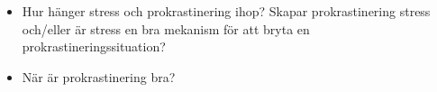 \begin{frame}
  \begin{question}
    \begin{itemize}
      \item Hur hänger stress och prokrastinering ihop? Skapar prokrastinering 
        stress och/eller är stress en bra mekanism för att bryta en 
        prokrastineringssituation?
    \end{itemize}
  \end{question}
\end{frame}

\begin{frame}
  \begin{question}
    \begin{itemize}
      \item När är prokrastinering bra?
    \end{itemize}
  \end{question}
\end{frame}
